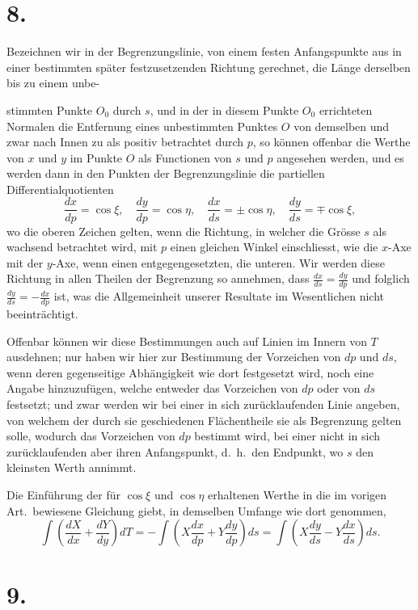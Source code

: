 \documentclass{article}
\begin{document}
\section*{8.}

Bezeichnen wir in der Begrenzungslinie, von einem festen Anfangspunkte aus in einer bestimmten später festzusetzenden Richtung gerechnet, die Länge derselben bis zu einem unbe-

stimmten Punkte $O_0$ durch $s$, und in der in diesem Punkte $O_0$ errichteten Normalen die Entfernung eines unbestimmten Punktes $O$ von demselben und zwar nach Innen zu als positiv betrachtet durch $p$, so können offenbar die Werthe von $x$ und $y$ im Punkte $O$ als Functionen von $s$ und $p$ angesehen werden, und es werden dann in den Punkten der Begrenzungslinie die partiellen Differentialquotienten
\[
\frac{dx}{dp} = \cos\xi, \quad \frac{dy}{dp} = \cos\eta, \quad \frac{dx}{ds} = \pm\cos\eta, \quad \frac{dy}{ds} = \mp\cos\xi,
\]
wo die oberen Zeichen gelten, wenn die Richtung, in welcher die Grösse $s$ als wachsend betrachtet wird, mit $p$ einen gleichen Winkel einschliesst, wie die $x$-Axe mit der $y$-Axe, wenn einen entgegengesetzten, die unteren. Wir werden diese Richtung in allen Theilen der Begrenzung so annehmen, dass $\frac{dx}{ds} = \frac{dy}{dp}$ und folglich $\frac{dy}{ds} = -\frac{dx}{dp}$ ist, was die Allgemeinheit unserer Resultate im Wesentlichen nicht beeinträchtigt.

Offenbar können wir diese Bestimmungen auch auf Linien im Innern von $T$ ausdehnen; nur haben wir hier zur Bestimmung der Vorzeichen von $dp$ und $ds$, wenn deren gegenseitige Abhängigkeit wie dort festgesetzt wird, noch eine Angabe hinzuzufügen, welche entweder das Vorzeichen von $dp$ oder von $ds$ festsetzt; und zwar werden wir bei einer in sich zurücklaufenden Linie angeben, von welchem der durch sie geschiedenen Flächentheile sie als Begrenzung gelten solle, wodurch das Vorzeichen von $dp$ bestimmt wird, bei einer nicht in sich zurücklaufenden aber ihren Anfangspunkt, d.\ h.\ den Endpunkt, wo $s$ den kleinsten Werth annimmt.

Die Einführung der für $\cos\xi$ und $\cos\eta$ erhaltenen Werthe in die im vorigen Art.\ bewiesene Gleichung giebt, in demselben Umfange wie dort genommen,
\[
\int \left(\frac{dX}{dx} + \frac{dY}{dy}\right) dT = -\int \left(X\frac{dx}{dp} + Y\frac{dy}{dp}\right) ds = \int \left(X\frac{dy}{ds} - Y\frac{dx}{ds}\right) ds.
\]

\section*{9.}
\end{document}
